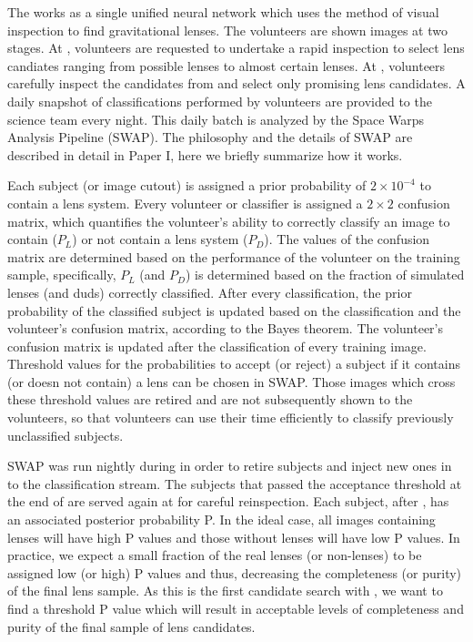 \documentclass[useAMS,usenatbib,a4paper]{mn2e}
\begin{document}
The \sw works as a single unified neural network which uses the method of visual
inspection to find gravitational lenses. The volunteers are shown images at two
stages. At \StageOne, volunteers are requested to undertake a rapid inspection to
select lens candiates ranging from possible lenses to almost certain lenses. At
\StageTwo, volunteers carefully inspect the candidates from \StageOne and select only
promising lens candidates. A daily snapshot of classifications performed by
volunteers are provided to the science team every night. This daily batch is
analyzed by the Space Warps Analysis Pipeline (SWAP). The philosophy and the
details of SWAP are described in detail in Paper I, here we briefly summarize
how it works.

Each subject (or image cutout) is assigned a prior probability of $2\times10^{-4}$ to
contain a lens system. Every volunteer or classifier is assigned a $2\times2$
confusion matrix, which quantifies the volunteer's ability to correctly classify
an image to contain ($P_L$) or not contain a lens system ($P_D$). The values of
the confusion matrix are determined based on the performance of the volunteer on
the training sample, specifically, $P_L$ (and $P_D$) is determined based on the
fraction of simulated lenses (and duds) correctly classified. After every
classification, the prior probability of the classified subject is updated
based on the classification and the volunteer's confusion matrix, according to the
Bayes theorem.  The volunteer's confusion matrix is updated after the classification
of every training image. Threshold values for the probabilities to accept (or
reject) a subject  if it contains (or doesn not contain) a lens can be
chosen in SWAP. Those images which cross these threshold values are retired and
are not subsequently shown to the volunteers, so that volunteers can use their
time efficiently to classify previously unclassified subjects.

SWAP was run nightly during \StageOne in order to retire subjects and inject new
ones in to the classification stream. The subjects that passed the acceptance
threshold at the end of \StageOne are served again at \StageTwo for careful
reinspection. Each subject, after \StageTwo, has an associated posterior
probability P. In the ideal case, all images containing lenses will have high P
values and those without lenses will have low P values. In practice, we expect a
small fraction of the real lenses (or non-lenses) to be assigned low (or high) P
values and thus, decreasing the completeness (or purity) of the final lens
sample.  As this is the first candidate search with \sw, we want to find a
threshold P value which will result in acceptable levels of completeness and
purity of the final sample of lens candidates.
\end{document}

